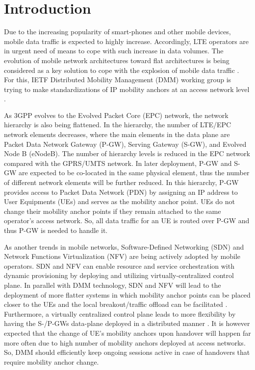 \documentclass[runningheads,a4paper]{llncs}
\begin{document}
\section{Introduction}
Due to the increasing popularity of smart-phones and other mobile devices, mobile data traffic is expected to highly increase. Accordingly, LTE operators are in urgent need of means to cope with such increase in data volumes. The evolution of mobile network architectures toward flat architectures is being considered as a key solution to cope with the explosion of mobile data traffic \cite{ref5}. For this, IETF Distributed Mobility Management (DMM) working group is trying to make standardizations of IP mobility anchors at an access network level \cite{ref6,ref7}. 

As 3GPP evolves to the Evolved Packet Core (EPC) network, the network hierarchy is also being flattened. In the hierarchy, the number of LTE/EPC network elements decreases, where the main elements in the data plane are Packet Data Network Gateway (P-GW), Serving Gateway (S-GW), and Evolved Node B (eNodeB). The number of hierarchy levels is reduced in the EPC network compared with the GPRS/UMTS network. In later deployment, P-GW and S-GW are expected to be co-located in the same physical element, thus the number of different network elements will be further reduced. In this hierarchy, P-GW provides access to Packet Data Network (PDN) by assigning an IP address to User Equipments (UEs) and serves as the mobility anchor point. UEs do not change their mobility anchor points if they remain attached to the same operator's access network. So, all data traffic for an UE is routed over P-GW and thus P-GW is needed to handle it.

As another trends in mobile networks, Software-Defined Networking (SDN) and Network Functions Virtualization (NFV) are being actively adopted by mobile operators. SDN and NFV can enable resource and service orchestration with dynamic provisioning by deploying and utilizing virtually-centralized control plane. In parallel with DMM technology, SDN and NFV will lead to the deployment of more flatter systems in which mobility anchor points can be placed closer to the UEs and the local breakout/traffic offload can be facilitated \cite{ref8}. Furthermore, a virtually centralized control plane leads to more flexibility by having the S-/P-GWs data-plane deployed in a distributed manner \cite{ref8-1}. It is however expected that the change of UE's mobility anchors upon handover will happen far more often due to high number of mobility anchors deployed at access networks. So, DMM should efficiently keep ongoing sessions active in case of handovers that require mobility anchor change. 
\end{document}
